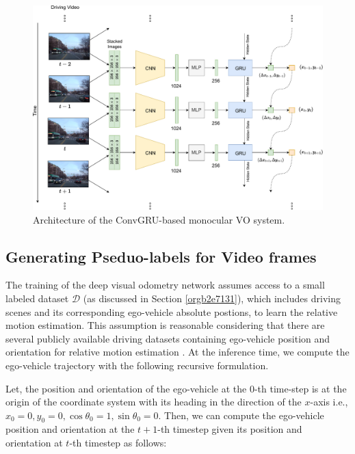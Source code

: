 \documentclass[12pt, letterpaper,cleardoubleempty,BCOR1cm]{scrbook}
\begin{document}
\begin{figure}[htpb]
\centering
\includegraphics[keepaspectratio,width=\textwidth,height=\textheight,angle=90]{./img/deepvo.pdf}
\caption{\label{fig:org8fe1c87}Architecture of the ConvGRU-based monocular VO system.}
\end{figure}

\subsection{Generating Pseduo-labels for Video frames}
\label{sec:org300232d}
The training of the deep visual odometry network assumes access to a small
labeled dataset \(\mathcal{D}\) (as discussed in Section \ref{orgb2e7131}), which includes driving
scenes and its corresponding ego-vehicle absolute postions, to learn the
relative motion estimation. This assumption is reasonable considering that there
are several publicly available driving datasets containing ego-vehicle position
and orientation for relative motion estimation
\cite{Geiger2012AreWR,Argoverse2}. At the inference time, we compute the
ego-vehicle trajectory with the following recursive formulation.

Let, the position and orientation of the ego-vehicle at the 0-th time-step is at
the origin of the coordinate system with its heading in the direction of the
\(x\)-axis i.e., \(x_{0}=0, y_{0}=0, \cos\theta_{0}=1, \sin\theta_{0}=0\). Then, we
can compute the ego-vehicle position and orientation at the \(t+1\)-th timestep
given its position and orientation at \(t\)-th timestep as follows:
\end{document}
